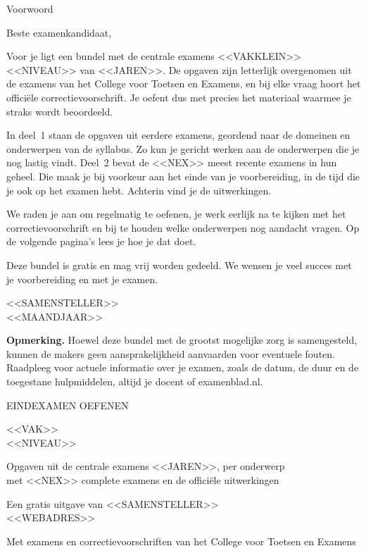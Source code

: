 \documentclass[11pt,twoside]{book}
\begin{document}
\clearpage
\thispagestyle{leeg}
\vspace*{12mm}
{\sffamily\zwart\fontsize{17}{20}\selectfont Voorwoord}\par\vskip 9mm
{\opmaakproza\fontsize{10.5}{15.5}\selectfont\setlength\parskip{2.6mm}
Beste examenkandidaat,

Voor je ligt een bundel met de centrale examens <<VAKKLEIN>> <<NIVEAU>> van <<JAREN>>. De opgaven zijn
letterlijk overgenomen uit de examens van het College voor Toetsen en Examens, en bij elke vraag hoort het
offici\"ele correctievoorschrift. Je oefent dus met precies het materiaal waarmee je straks wordt beoordeeld.

In deel~1 staan de opgaven uit eerdere examens, geordend naar de domeinen en onderwerpen van de syllabus.
Zo kun je gericht werken aan de onderwerpen die je nog lastig vindt. Deel~2 bevat de <<NEX>> meest recente examens
in hun geheel. Die maak je bij voorkeur aan het einde van je voorbereiding, in de tijd die je ook op het examen hebt.
Achterin vind je de uitwerkingen.

We raden je aan om regelmatig te oefenen, je werk eerlijk na te kijken met het correctievoorschrift en bij te houden
welke onderwerpen nog aandacht vragen. Op de volgende pagina's lees je hoe je dat doet.

Deze bundel is gratis en mag vrij worden gedeeld. We wensen je veel succes met je voorbereiding en met je examen.\par}
\vskip 7mm
{\sffamily\small <<SAMENSTELLER>>\\ \color{grijs}<<MAANDJAAR>>\par}
\vfill
{\opmaakproza\scriptsize\color{grijs}\textbf{Opmerking.} Hoewel deze bundel met de grootst mogelijke zorg is samengesteld,
kunnen de makers geen aansprakelijkheid aanvaarden voor eventuele fouten. Raadpleeg voor actuele informatie over je
examen, zoals de datum, de duur en de toegestane hulpmiddelen, altijd je docent of examenblad.nl.\par}
\clearpage

\thispagestyle{leeg}
\vspace*{30mm}
{\sffamily\halfvet\footnotesize\color{kleur1}EINDEXAMEN OEFENEN}\par\vskip 6mm
{\sffamily\zwart\fontsize{30}{32}\selectfont <<VAK>>\\[1mm]\licht <<NIVEAU>>}\par\vskip 8mm
{\large Opgaven uit de centrale examens <<JAREN>>, per onderwerp\\ met <<NEX>> complete examens en de offici\"ele uitwerkingen\par}
\vfill
{\sffamily\small Een gratis uitgave van <<SAMENSTELLER>>\\ \color{grijs}<<WEBADRES>>\par}
\vskip 4mm
{\sffamily\scriptsize\color{grijs}Met examens en correctievoorschriften van het College voor Toetsen en Examens\par}
\clearpage
\end{document}
